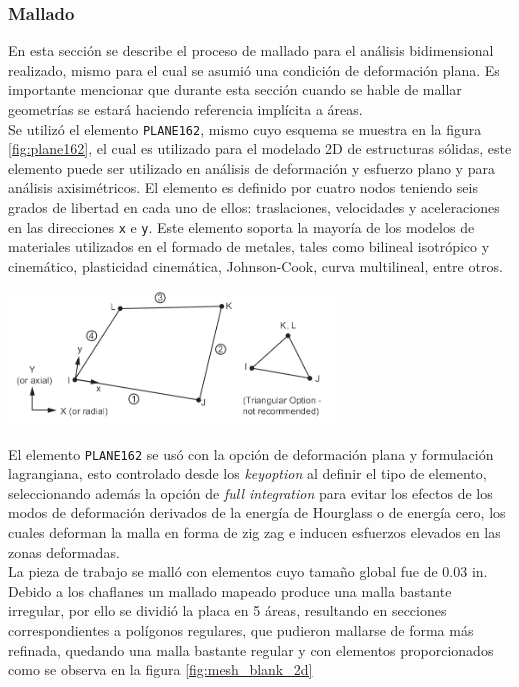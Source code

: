 \subsubsection{Mallado}

En esta sección se describe el proceso de mallado para el análisis bidimensional realizado, 
mismo para el cual se asumió una condición de deformación plana. Es importante mencionar 
que durante esta sección cuando se hable de mallar geometrías se estará haciendo referencia 
implícita a áreas.\\

Se utilizó el elemento \texttt{PLANE162}, mismo cuyo esquema se muestra en la figura \ref{fig:plane162}, 
el cual es utilizado para el modelado 2D de estructuras sólidas, este elemento puede ser utilizado en 
análisis de deformación y esfuerzo plano y para análisis axisimétricos. El elemento es definido por 
cuatro nodos teniendo seis grados de libertad en cada uno de ellos: traslaciones, velocidades y 
aceleraciones en las direcciones \texttt{x} e \texttt{y}. Este elemento soporta la mayoría de los modelos 
de materiales utilizados en el formado de metales, tales como bilineal isotrópico y cinemático, plasticidad 
cinemática, Johnson-Cook, curva multilineal, entre otros.

\begin{center}
\includegraphics[width=0.65\textwidth]{src/ch3/plane162.png}
\label{fig:plane162}
\end{center}

El elemento \texttt{PLANE162} se usó con la opción de deformación plana y formulación lagrangiana, esto controlado 
desde los \textit{keyoption} al definir el tipo de elemento, seleccionando además la opción de \textit{full integration} 
para evitar los efectos de los modos de deformación derivados de la energía de Hourglass o de energía cero, los cuales 
deforman la malla en forma de zig zag e inducen esfuerzos elevados en las zonas deformadas.\\

La pieza de trabajo se malló con elementos cuyo tamaño global fue de 0.03 in. Debido a los chaflanes 
un mallado mapeado produce una malla bastante irregular, por ello se dividió la placa en 5 áreas, resultando 
en secciones correspondientes a polígonos regulares, que pudieron mallarse de forma más refinada, 
quedando una malla bastante regular y con elementos proporcionados como se observa en la figura \ref{fig:mesh_blank_2d}

